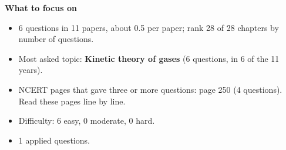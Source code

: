 \begin{minipage}[t]{0.63\linewidth}{\small\textbf{\color{crimson}What to focus on}\par\smallskip
\begin{itemize}[leftmargin=1.1em,itemsep=1pt,topsep=0pt]
\item 6 questions in 11 papers, about 0.5 per paper; rank 28 of 28 chapters by number of questions.
\item Most asked topic: \textbf{Kinetic theory of gases} (6 questions, in 6 of the 11 years).
\item NCERT pages that gave three or more questions: page 250 (4 questions). Read these pages line by line.
\item Difficulty: 6 easy, 0 moderate, 0 hard.
\item 1 applied questions.
\end{itemize}}\end{minipage}\par
{}
